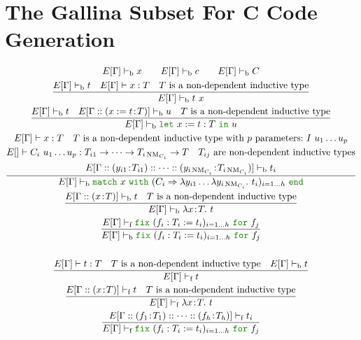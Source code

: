 \documentclass[a4paper,fleqn]{article}
\def\gallina{\textrm{Gallina}}
\newcommand{\kwlet}{\mbox{\color{mygreen}\ttfamily let}}
\newcommand{\kwin}{\mbox{\color{mygreen}\ttfamily in}}
\newcommand{\kwmatch}{\mbox{\color{mygreen}\ttfamily match}}
\newcommand{\kwwith}{\mbox{\color{mygreen}\ttfamily with}}
\newcommand{\kwend}{\mbox{\color{mygreen}\ttfamily end}}
\newcommand{\kwfix}{\mbox{\color{mygreen}\ttfamily fix}}
\newcommand{\kwfor}{\mbox{\color{mygreen}\ttfamily for}}
\newcommand{\lamT}[3]{\lambda #1\!:\!#2.~#3}
\newcommand{\lamB}[1]{\lambda #1.~}
\newcommand{\lassum}[2]{(#1\!:\!#2)}
\newcommand{\ldef}[3]{(#1:=#2\!:\!#3)}
\newcommand{\letin}[3]{\kwlet~#1:=#2~\kwin~#3}
\newcommand{\match}[4]{\kwmatch~#1~\kwwith~(#2 \Rightarrow #3)_{#4}~\kwend}
\newcommand{\fix}[4]{\kwfix~(#1 := #2)_{#3}~\kwfor~#4}
\DeclareMathOperator{\NM}{NM}
\newcommand{\vdashb}{\vdash_{\textrm{b}}}
\newcommand{\vdashf}{\vdash_{\textrm{f}}}
\begin{document}
\section{The \gallina{} Subset For C Code Generation}\label{sec:gallinasubsetforcgen}
\raggedright
\begin{gather*}
  E[\Gamma] \vdashb x \qquad
  E[\Gamma] \vdashb c \qquad
  E[\Gamma] \vdashb C \\
  \dfrac{
    E[\Gamma] \vdashb t \quad
    E[\Gamma] \vdash x : T \quad
    \text{$T$ is a non-dependent inductive type}
  }{
    E[\Gamma] \vdashb t~x
  } \\
  \dfrac{
    E[\Gamma] \vdashb t \quad
    E[\Gamma::\ldef{x}{t}{T}] \vdashb u \quad
    \text{$T$ is a non-dependent inductive type}
  }{
    E[\Gamma] \vdashb \letin{x}{t:T}{u}
  } \\
  \dfrac{
    \begin{gathered}
      E[\Gamma] \vdash x:T \quad
      \text{$T$ is a non-dependent inductive type with $p$ parameters:}~I~u_1\dots u_p \\
      E[] \vdash C_i~u_1\dots u_p: T_{i1} \rightarrow \dots \rightarrow T_{i\NM_{C_i}} \rightarrow T \quad
      \text{$T_{ij}$ are non-dependent inductive types} \\
      E[\Gamma::\lassum{y_{i1}}{T_{i1}}::\dots::\lassum{y_{i\NM_{C_i}}}{T_{i\NM_{C_i}}}] \vdashb t_i
    \end{gathered}
  }{
    E[\Gamma] \vdashb \match{x}{C_i}{\lambda y_{i1}\dots\lamB{y_{i\NM_{C_i}}}t_i}{i=1\dots h}
  } \\
  \dfrac{
    E[\Gamma::\lassum{x}{T}] \vdashb t \quad
    \text{$T$ is a non-dependent inductive type}
  }{
    E[\Gamma] \vdashb \lamT{x}{T}{t}
  } \\
  \dfrac{
    E[\Gamma] \vdashf \fix{f_i:T_i}{t_i}{i=1\dots h}{f_j}
  }{
    E[\Gamma] \vdashb \fix{f_i:T_i}{t_i}{i=1\dots h}{f_j}
  } \\
  \\
  \dfrac{
    E[\Gamma] \vdash t : T \quad
    \text{$T$ is a non-dependent inductive type} \quad
    E[\Gamma] \vdashb t
  }{
    E[\Gamma] \vdashf t
  } \\
  \dfrac{
    E[\Gamma::\lassum{x}{T}] \vdashf t \quad
    \text{$T$ is a non-dependent inductive type}
  }{
    E[\Gamma] \vdashf \lamT{x}{T}{t}
  } \\
  \dfrac{
    E[\Gamma::\lassum{f_1}{T_1}::\dots::\lassum{f_h}{T_h}] \vdashf t_i
  }{
    E[\Gamma] \vdashf \fix{f_i:T_i}{t_i}{i=1\dots h}{f_j}
  }
\end{gather*}
\end{document}

